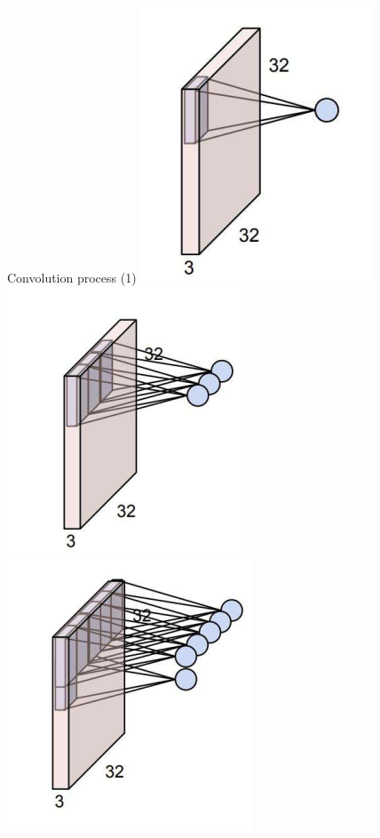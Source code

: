 \documentclass[serif, aspectratio=169]{beamer}
\begin{document}
	\begin{frame}{Convolution process (1)}
	\centering
	\includegraphics[keepaspectratio, scale=0.7]{pic/img2.png}
	\includegraphics[keepaspectratio, scale=0.7]{pic/img3.png}
	\includegraphics[keepaspectratio, scale=0.7]{pic/img4.png}	
	
	\end{frame}
\end{document}
